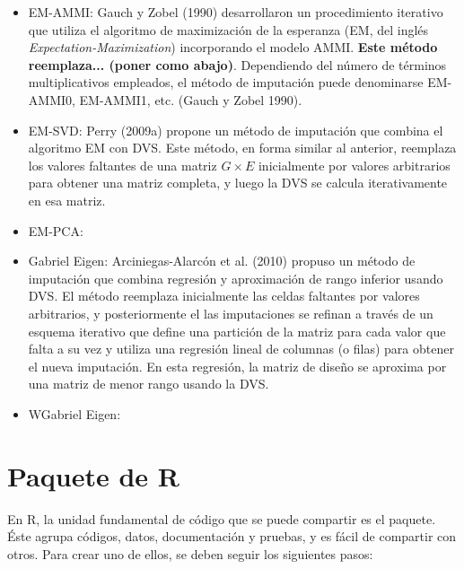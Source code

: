 \begin{itemize}
\item EM-AMMI: Gauch y Zobel (1990) desarrollaron un procedimiento iterativo que utiliza el algoritmo de maximización de la esperanza (EM, del inglés \emph{Expectation-Maximization}) incorporando el modelo AMMI. \textbf{Este método reemplaza... (poner como abajo)}. Dependiendo del número de términos multiplicativos empleados, el método de imputación puede denominarse EM-AMMI0, EM-AMMI1, etc. (Gauch y Zobel 1990). 
\end{itemize}
\begin{itemize}
\item EM-SVD: Perry (2009a) propone un método de imputación que combina el algoritmo EM con DVS. Este método, en forma similar al anterior, reemplaza los valores faltantes de una matriz $G \times E$ inicialmente por valores arbitrarios para obtener una matriz completa, y luego la DVS se calcula iterativamente en esa matriz. 
\end{itemize}
\begin{itemize}
\item EM-PCA:
\end{itemize}
\begin{itemize}
\item Gabriel Eigen: Arciniegas-Alarcón et al. (2010) propuso un método de imputación que combina regresión y aproximación de rango inferior usando DVS. El método reemplaza inicialmente las celdas faltantes por valores arbitrarios, y posteriormente el
las imputaciones se refinan a través de un esquema iterativo que define una partición de la matriz para cada valor que falta a su vez y utiliza una regresión lineal de columnas (o filas) para obtener el nueva imputación. En esta regresión, la matriz de diseño se aproxima por una matriz de menor rango usando la DVS.
\end{itemize}
\begin{itemize}
\item WGabriel Eigen:
\end{itemize}




\section{Paquete de R}

En R, la unidad fundamental de código que se puede compartir es el paquete. Éste agrupa códigos, datos, documentación y pruebas, y es fácil de compartir con otros. Para crear uno de ellos, se deben seguir los siguientes pasos:

